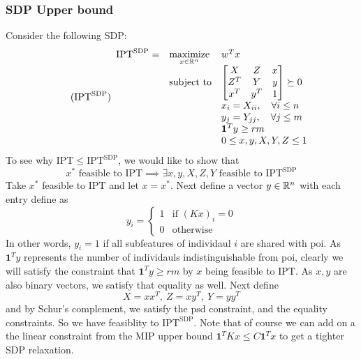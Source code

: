 \documentclass[12pt]{article}
\newcommand{\priv}{\text{IPT}}
\newcommand{\privsdp}{\text{IPT}^\text{SDP}}
\begin{document}
\subsubsection{SDP Upper bound}
Consider the following SDP:
\begin{equation}
	\label{eq:privsdp} 
    \tag{$\privsdp$} 
	\begin{array}{lll}
		\privsdp = & \underset{x\in\mr^n}{\text{maximize}} & w^T x \\
		& \mbox{subject to} &  
        \begin{bmatrix}
            \begin{matrix}
                X
            \end{matrix}  & 
            \begin{matrix}
                Z
            \end{matrix} & x \\
            \begin{matrix}
                Z^T 
            \end{matrix} & 
            \begin{matrix}
                Y 
            \end{matrix} & y \\
            x^T & y^T & 1
        \end{bmatrix} \succeq 0\\
        && x_i = X_{ii}, \quad \forall i\leq n\\
        && y_j = Y_{jj}, \quad \forall j \leq m\\
        && \mathbf{1}^Ty \geq rm \\
        && 0 \leq x,y,X,Y,Z \leq 1
		\end{array}
\end{equation}
To see why $\priv \leq \privsdp$, we would like to show that
\[x^* \text{ feasible to } \priv \implies \exists x,y,X,Z,Y \text{ feasible to }\privsdp\] 
Take $x^*$ feasible to $\priv$ and let $x = x^*$. Next define a vector $y \in \mathbb{R}^n$ with each entry define as
\[y_i = \begin{cases}
    1 & \text{if } (Kx)_i = 0 \\
    0 & \text{otherwise}
\end{cases}\]
In other words, $y_i = 1$ if all subfeatures of individaul $i$ are shared with \gls{poi}. As $\mathbf{1}^Ty$ represents the number of individauls indistinguishable from \gls{poi}, clearly we will satisfy the constraint that $\mathbf{1}^Ty \geq rm$ by $x$ being feasible to $\priv$. As $x,y$ are also binary vectors, we satisfy that equality as well. Next define \[X = xx^T, \ Z = xy^T, \ Y = yy^T\]
and by Schur's complement, we satisfy the psd constraint, and the equality constraints. So we have feasiblity to $\privsdp$. Note that of course we can add on a the linear constraint from the MIP upper bound $\mathbf{1}^TKx \leq C\mathbf{1}^Tx$ to get a tighter SDP relaxation.\
\end{document}
